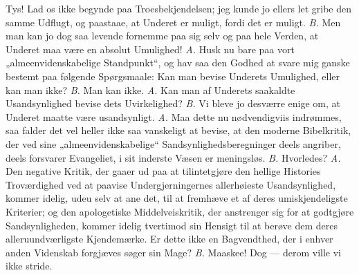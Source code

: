 \documentclass[12pt,a4paper]{book}
\begin{document}
Tys! Lad os ikke begynde paa Troesbekjendelsen; jeg kunde jo ellers let gribe
den samme Udflugt, og paastaae, at Underet er muligt, fordi det er muligt.
\textit{B.} Men man kan jo dog saa levende fornemme paa sig selv og paa hele
Verden, at Underet maa være en absolut Umulighed! \textit{A.} Husk nu bare paa
vort „almeenvidenskabelige Standpunkt“, og hav saa den Godhed at svare mig
ganske bestemt paa følgende Spørgsmaale: Kan man bevise Underets Umulighed,
eller kan man ikke? \textit{B.} Man kan ikke. \textit{A.} Kan man af Underets
saakaldte Usandsynlighed bevise dets
Uvirkelighed? \textit{B.} Vi bleve jo desværre enige om, at Underet maatte være
usandsynligt. \textit{A.} Maa dette nu nødvendigviis indrømmes, saa falder det
vel heller ikke saa vanskeligt at bevise, at den moderne Bibelkritik, der ved
sine „almeenvidenskabelige“ Sandsynlighedsberegninger deels angriber, deels
forsvarer Evangeliet, i sit inderste Væsen er meningsløs. \textit{B.}
Hvorledes? \textit{A.} Den negative Kritik, der gaaer ud paa at tilintetgjøre
den hellige Histories Troværdighed ved at paavise
Undergjerningernes allerhøieste Usandsynlighed, kommer idelig,
udeu selv at ane det, til at fremhæve et af deres umiskjendeligste Kriterier; og
den apologetiske Middelveiskritik, der anstrenger sig for at godtgjøre
Sandsynligheden, kommer idelig tvertimod sin Hensigt til at berøve dem deres
alleruundværligste Kjendemærke. Er dette ikke en Bagvendthed, der i enhver anden
Videnskab forgjæves søger sin Mage? \textit{B.} Maaskee! Dog --- derom ville vi
ikke stride.
\end{document}
